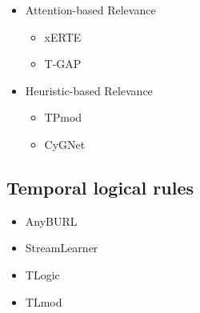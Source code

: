 \documentclass[12pt]{article}
\begin{document}
\begin{itemize}
    \item Attention-based Relevance
    \begin{itemize}
        \item xERTE
        \item T-GAP
    \end{itemize}
    \item Heuristic-based Relevance
    \begin{itemize}
        \item TPmod
        \item CyGNet
    \end{itemize}
\end{itemize}

\subsection{Temporal logical rules}

\begin{itemize}
    \item AnyBURL
    \item StreamLearner
    \item TLogic
    \item TLmod
\end{itemize}
\end{document}
